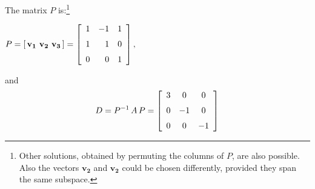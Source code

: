 \documentclass[12pt]{article}
\begin{document}
{The matrix $P$ is:\footnote{
Other solutions, obtained by permuting the columns of 
$P$, are also possible. Also the vectors $\mathbf{v_2}$ 
and $\mathbf{v_2}$ could be chosen differently, provided 
they span the same subspace.}

$\displaystyle{P = [\,\mathbf{v_1\ v_2\ v_3}\,] =
\left [\begin {array}{rrr} 1&-1&1\\\noalign{\medskip}1&1&0
\\\noalign{\medskip}0&0&1\end {array}\right ],
}$

and
\[
D = P^{-1}\,A\,P = 
\left [\begin {array}{ccc} 3&0&0\\\noalign{\medskip}0&-1&0
\\\noalign{\medskip}0&0&-1\end {array}\right ]
\]


}

\clearpage

\end{document}
